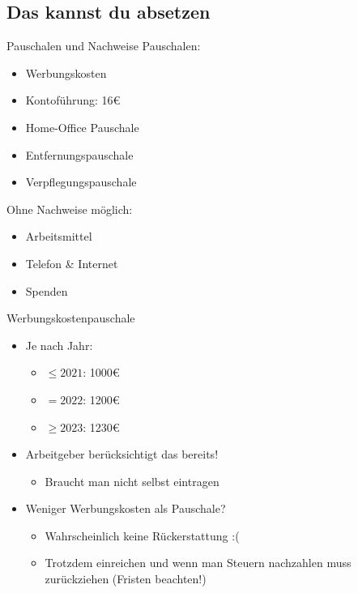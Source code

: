 \documentclass{beamer}
\begin{document}
		\subsection{Das kannst du absetzen}
		
			\begin{frame}{Pauschalen und Nachweise}
				Pauschalen:
				\begin{itemize}
					\item Werbungskosten
					\item Kontoführung: 16€
					\item Home-Office Pauschale
					\item Entfernungspauschale
					\item Verpflegungspauschale
				\end{itemize}
				Ohne Nachweise möglich:
				\begin{itemize}
					\item Arbeitsmittel
					\item Telefon \& Internet
					\item Spenden
				\end{itemize}
			\end{frame}
			
			\begin{frame}{Werbungskostenpauschale}
				\begin{itemize}
					\item Je nach Jahr:
					\begin{itemize}
						\item $\leq2021$: 1000€
						\item $=2022$: 1200€
						\item $\geq2023$: 1230€
					\end{itemize}
					\item Arbeitgeber berücksichtigt das bereits!
					\begin{itemize}
						\item Braucht man nicht selbst eintragen
					\end{itemize}
					\item Weniger Werbungskosten als Pauschale?
					\begin{itemize}
						\item Wahrscheinlich keine Rückerstattung :(
						\item Trotzdem einreichen und wenn man Steuern nachzahlen muss zurückziehen (Fristen beachten!)
					\end{itemize}
				\end{itemize}
			\end{frame}
		
\end{document}
